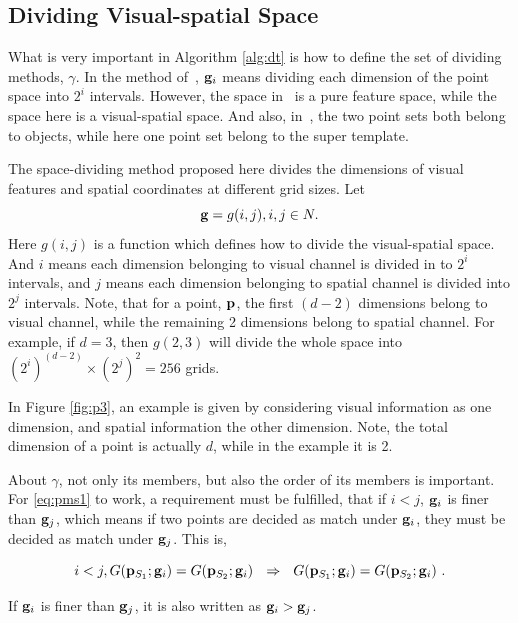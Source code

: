 \subsection{Dividing Visual-spatial Space}

What is very important in Algorithm \ref{alg:dt} is how to define the set of dividing methods, $\gamma$. In the method of~\citep{pmk}, ${\bf g}_i$ means dividing each dimension of the point space into $2^i$ intervals. However, the space in~\citep{pmk} is a pure feature space, while the space here is a visual-spatial space. And also, in~\citep{pmk}, the two point sets both belong to objects, while here one point set belong to the super template.

The space-dividing method proposed here divides the dimensions of visual features and spatial coordinates at different grid sizes. Let
\[{\bf g} = g(i,j),i,j \in N.\]
Here $g(i,j)$ is a function which defines how to divide the visual-spatial space. And $i$ means each dimension belonging to visual channel is divided in to $2^i$ intervals, and $j$ means each dimension belonging to spatial channel is divided into $2^j$ intervals. Note, that for a point, $\bf p$, the first $(d-2)$ dimensions belong to visual channel, while the remaining 2 dimensions belong to spatial channel. For example, if $d=3$, then $g(2,3)$ will divide the whole space into $(2^i)^{(d-2)}\times (2^j)^2=256$ grids.

In Figure \ref{fig:p3}, an example is given by considering visual information as one dimension, and spatial information the other dimension. Note, the total dimension of a point is actually $d$, while in the example it is 2.

About $\gamma$, not only its members, but also the order of its members is important. For \ref{eq:pms1} to work, a requirement must be fulfilled, that if $i<j$, ${\bf g}_i$ is finer than ${\bf g}_j$, which means if two points are decided as match under ${\bf g}_i$, they must be decided as match under ${\bf g}_j$.  This is,



\begin{equation}
i<j, G({\bf p}_{S_1};{\bf g}_i)=G({\bf p}_{S_2};{\bf g}_i)\mbox{     }\mbox{     }\Rightarrow \mbox{     }\mbox{     }G({\bf p}_{S_1};{\bf g}_i)=G({\bf p}_{S_2};{\bf g}_i)\ .
\label{eq:pms3}
\end{equation}

If ${\bf g}_i$ is finer than ${\bf g}_j$, it is also written as ${\bf g}_i>{\bf g}_j$.

